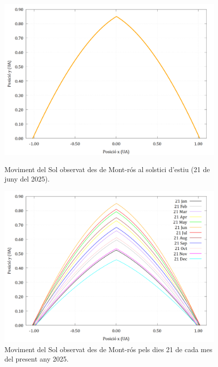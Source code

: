 \documentclass[10pt, twoside, a4paper]{article}
\begin{document}
\begin{figure}[h!]
    \centering
    \begin{minipage}{0.48\linewidth} 
        \centering
        \includegraphics[width=\linewidth]{mov_sol_solstici.png}
        \caption{Moviment del Sol observat des de Mont-rós al solstici d'estiu (21 de juny del 2025).}
        \label{fig:solstici}
    \end{minipage}\hfill 
    \begin{minipage}{0.48\linewidth} 
        \centering
        \includegraphics[width=\linewidth]{mov_sol_mesos.png}
        \caption{Moviment del Sol observat des de Mont-rós pels dies 21 de cada mes del present any 2025.}
        \label{fig:mesos}
    \end{minipage}
\end{figure}
\end{document}
